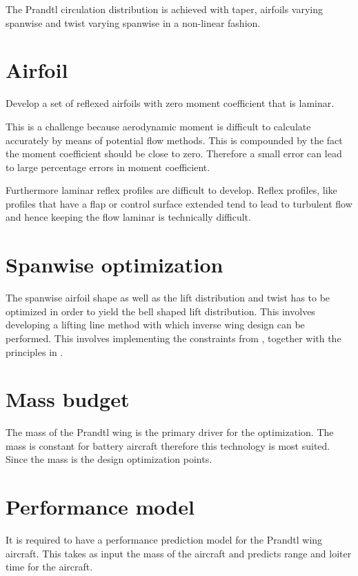 \documentclass{report}
\begin{document}
The Prandtl circulation distribution is achieved with taper, airfoils varying spanwise and twist varying spanwise in a non-linear fashion.


\section{Airfoil}

Develop a set of reflexed airfoils with zero moment coefficient that is laminar.

This is a challenge because aerodynamic moment is difficult to calculate accurately by means of potential flow methods.  This is compounded by the fact the moment coefficient should be close to zero.  Therefore a small error can lead to large percentage errors in moment coefficient.

Furthermore laminar reflex profiles are difficult to develop.  Reflex profiles, like profiles that have a flap or control surface extended tend to lead to turbulent flow and hence keeping the flow laminar is technically difficult.

\section{Spanwise optimization}


The spanwise airfoil shape as well as the lift distribution and twist has to be optimized in order to yield the bell shaped lift distribution.  This involves developing a lifting line method with which inverse wing design can be performed.  This involves implementing the constraints from \cite{Prandtl1933}, together with the principles in \cite{PrandtlBowers}.

\section{Mass budget}

The mass of the Prandtl wing is the primary driver for the optimization.  The mass is constant for battery aircraft therefore this technology is most suited.  Since the mass is the design optimization points.

\section{Performance model}

It is required to have a performance prediction model for the Prandtl wing aircraft.  This takes as input the mass of the aircraft and predicts range and loiter time for the aircraft.
\end{document}

